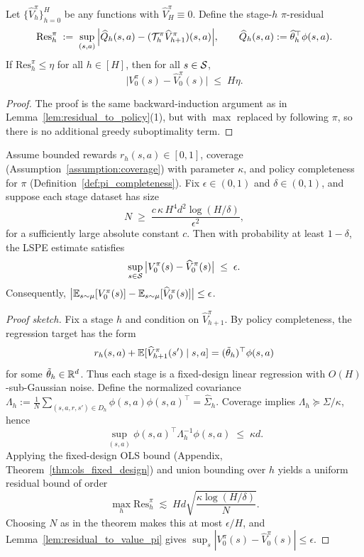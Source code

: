 \begin{lemma}\label{lem:residual_to_value_pi}
Let $\{\widehat V_h^\pi\}_{h=0}^H$ be any functions with $\widehat V_H^\pi\equiv 0$.
Define the stage-$h$ $\pi$-residual
\[
\mathrm{Res}_h^\pi \;:=\; \sup_{(s,a)}\Big| \widehat Q_h(s,a) - (\mathcal{T}_h^\pi \widehat V_{h+1}^\pi)(s,a)\Big|,
\qquad
\widehat Q_h(s,a):=\widehat\theta_h^\top\phi(s,a).
\]
If $\mathrm{Res}_h^\pi \le \eta$ for all $h\in[H]$, then for all $s\in\mathcal{S}$,
\[
\big|V_0^\pi(s) - \widehat V_0^\pi(s)\big| \;\le\; H\eta.
\]
\end{lemma}

\begin{proof}
The proof is the same backward-induction argument as in
Lemma~\ref{lem:residual_to_policy}(1), but with $\max$ replaced by following $\pi$,
so there is no additional greedy suboptimality term.
\end{proof}

\begin{theorem}\label{thm:lspe_bc_offline}
Assume bounded rewards $r_h(s,a)\in[0,1]$, coverage (Assumption~\ref{assumption:coverage})
with parameter $\kappa$, and policy completeness for $\pi$ (Definition~\ref{def:pi_completeness}).
Fix $\epsilon\in(0,1)$ and $\delta\in(0,1)$, and suppose each stage dataset has size
\[
N \;\ge\; \frac{c\,\kappa\,H^4 d^2 \log(H/\delta)}{\epsilon^2},
\]
for a sufficiently large absolute constant $c$.
Then with probability at least $1-\delta$, the LSPE estimate satisfies
\[
\sup_{s\in\mathcal{S}}\big|V_0^\pi(s) - \widehat V_0^\pi(s)\big| \;\le\; \epsilon.
\]
Consequently, $\big|\mathbb{E}_{s\sim\mu}[V_0^\pi(s)] - \mathbb{E}_{s\sim\mu}[\widehat V_0^\pi(s)]\big|\le \epsilon$.
\end{theorem}

\begin{proof}[Proof sketch]
Fix a stage $h$ and condition on $\widehat V_{h+1}^\pi$. By policy completeness,
the regression target has the form
\[
r_h(s,a)+\mathbb{E}[\widehat V_{h+1}^\pi(s')\mid s,a]=(\tilde\theta_h)^\top\phi(s,a)
\]
for some $\tilde\theta_h\in\mathbb{R}^d$. Thus each stage is a fixed-design linear regression with
$O(H)$-sub-Gaussian noise. Define the normalized covariance
$\Lambda_h:=\frac{1}{N}\sum_{(s,a,r,s')\in D_h}\phi(s,a)\phi(s,a)^\top=\widehat\Sigma_h$.
Coverage implies $\Lambda_h\succeq \Sigma/\kappa$, hence
\[
\sup_{(s,a)}\phi(s,a)^\top \Lambda_h^{-1}\phi(s,a)
\;\le\;
\kappa d.
\]
Applying the fixed-design OLS bound (Appendix, Theorem~\ref{thm:ols_fixed_design})
and union bounding over $h$ yields a uniform residual bound of order
\[
\max_h \mathrm{Res}_h^\pi \;\lesssim\; H d \sqrt{\frac{\kappa\log(H/\delta)}{N}}.
\]
Choosing $N$ as in the theorem makes this at most $\epsilon/H$, and
Lemma~\ref{lem:residual_to_value_pi} gives $\sup_s|V_0^\pi(s)-\widehat V_0^\pi(s)|\le \epsilon$.
\end{proof}

